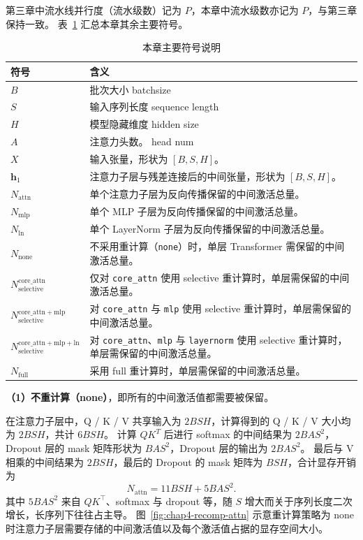 第三章中流水线并行度（流水级数）记为 $P$，本章中流水级数亦记为 $P$，与第三章保持一致。
表~\ref{tab:chap4-symbols} 汇总本章其余主要符号。

\begin{table}[htbp]
  \centering
  \caption{本章主要符号说明}
  \label{tab:chap4-symbols}
  \small
  \renewcommand{\arraystretch}{1.3}
  \begin{tabular}{@{}p{2.6cm}p{10cm}@{}}
    \toprule
    \textbf{符号} & \textbf{含义} \\
    \midrule
    $B$ & 批次大小 batchsize \\
    $S$ & 输入序列长度 sequence length \\
    $H$ & 模型隐藏维度 hidden size\\
    $A$ & 注意力头数。 head num\\
    $X$ & 输入张量，形状为 $[B,S,H]$。 \\
    $\mathbf{h}_1$ & 注意力子层与残差连接后的中间张量，形状为 $[B,S,H]$。 \\
    $N_{\mathrm{attn}}$ & 单个注意力子层为反向传播保留的中间激活总量。 \\
    $N_{\mathrm{mlp}}$ & 单个 MLP 子层为反向传播保留的中间激活总量。 \\
    $N_{\mathrm{ln}}$ & 单个 LayerNorm 子层为反向传播保留的中间激活总量。 \\
    $N_{\mathrm{none}}$ & 不采用重计算（\texttt{none}）时，单层 Transformer 需保留的中间激活总量。 \\
    $N_{\mathrm{selective}}^{\mathrm{core\_attn}}$ & 仅对 \texttt{core\_attn} 使用 selective 重计算时，单层需保留的中间激活总量。 \\
    $N_{\mathrm{selective}}^{\mathrm{core\_attn+mlp}}$ & 对 \texttt{core\_attn} 与 \texttt{mlp} 使用 selective 重计算时，单层需保留的中间激活总量。 \\
    $N_{\mathrm{selective}}^{\mathrm{core\_attn+mlp+ln}}$ & 对 \texttt{core\_attn}、\texttt{mlp} 与 \texttt{layernorm} 使用 selective 重计算时，单层需保留的中间激活总量。 \\
    $N_{\mathrm{full}}$ & 采用 full 重计算时，单层需保留的中间激活总量。 \\
    \bottomrule
  \end{tabular}
  \renewcommand{\arraystretch}{1.0}
\end{table}

\textbf{（1）不重计算（none）}，即所有的中间激活值都需要被保留。

在注意力子层中，Q / K / V 共享输入为 $2 B S H$，计算得到的 Q / K / V 大小均为 $2 B S H$，共计 $6 B S H$。
计算 $QK^{T}$ 后进行 softmax 的中间结果为 $2B A S^2$，Dropout 层的 mask 矩阵形状为 $B A S^2$，Dropout 层的输出为 $2 B A S^2$。
最后与 V 相乘的中间结果为 $2 B S H$，最后的 Dropout 的 mask 矩阵为 $B S H$，合计显存开销为
\begin{equation}
  N_{\mathrm{attn}} = 11 B S H + 5 B A S^2.
\end{equation}
其中 $5 B A S^2$ 来自 $QK^{\top}$、softmax 与 dropout 等，随 $S$ 增大而关于序列长度二次增长，长序列下往往占主导。
图~\ref{fig:chap4-recomp-attn} 示意重计算策略为 none 时注意力子层需要存储的中间激活值以及每个激活值占据的显存空间大小。

